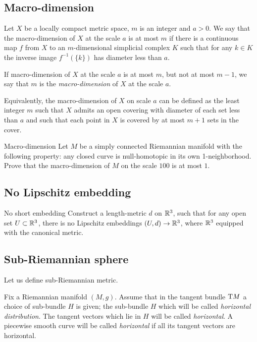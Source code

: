 \subsection*{Macro-dimension\easy}

Let $X$ be a locally compact metric space,
$m$ is an integer
and $a>0$.
We say that the macro-dimension  of $X$ at the scale $a$ is at most $m$
if there is a continuous map $f$ from $X$ to an $m$-dimensional simplicial complex $K$
such that for any $k\in K$ the inverse image $f^{-1}(\{k\})$ has diameter less than $a$.

If macro-dimension of $X$ at the scale $a$ is at most $m$,
but not at most $m-1$, 
we say that $m$ is the \emph{macro-dimension} of $X$ at the scale $a$.

Equivalently, the macro-dimension of $X$ on scale $a$ can be defined as 
the least integer $m$ such that $X$ admits an open covering with diameter of each set less than $a$ 
and such that each point in $X$ is covered by at most $m+1$ sets in the cover.

\begin{pr}{\easy}{Macro-dimension}\label{macro-dimension} 
Let $M$ be a simply connected Riemannian manifold with the following property: 
any closed curve is null-homotopic 
in its own  1-neighborhood. 
Prove that the macro-dimension of $M$ on the scale $100$ is at most $1$.
\end{pr}

\subsection*{No Lipschitz embedding\hard}

\begin{pr}{\hard}{No short embedding}\label{weird-metric} 
Construct a length-metric $d$ on $\mathbb{R}^3$,
such that for any open set $U\subset  \mathbb{R}^3$,
there is no Lipschitz embeddings $(U,d)\to \mathbb{R}^3$,
where $\mathbb{R}^3$ equipped with the canonical metric.
\end{pr}

\subsection*{Sub-Riemannian sphere\thm}

Let us define sub-Riemannian metric.

Fix a Riemannian manifold $(M,g)$.
Assume that in the tangent bundle $\mathrm{T} M$ 
a choice of sub-bundle $H$ is given;
the sub-bundle $H$ which will be called  \emph{horizontal distribution}.
The tangent vectors which lie in $H$ will be called {}\emph{horizontal}.
A piecewise smooth curve will be called {}\emph{horizontal}
if all its tangent vectors are horizontal.

